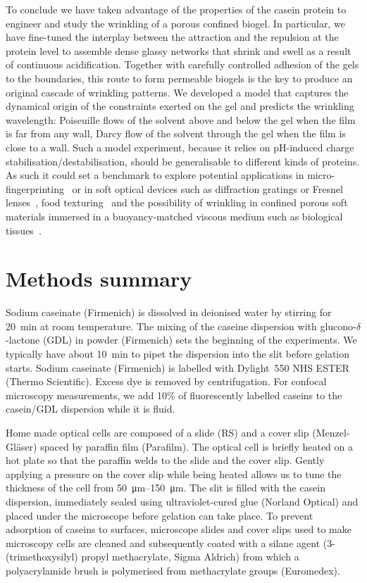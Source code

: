\documentclass[twocolumn,superscriptaddress,showpacs,preprintnumbers,
amsmath,amssymb,prl]{revtex4-1}
\begin{document}
To conclude we have taken advantage of the properties of the casein protein to engineer and study the wrinkling of a porous confined biogel. In particular, we have fine-tuned the interplay between the attraction and the repulsion at the protein level to assemble dense glassy networks that shrink and swell as a result of continuous acidification. Together with carefully controlled adhesion of the gels to the boundaries, this route to form permeable biogels is the key to produce an original cascade of wrinkling patterns. We developed a model that captures the dynamical origin of the constraints exerted on the gel and predicts the wrinkling wavelength: Poiseuille flows of the solvent above and below the gel when the film is far from any wall, Darcy flow of the solvent through the gel when the film is close to a wall. Such a model experiment, because it relies on pH-induced charge stabilisation/destabilisation, should be generalisable to different kinds of proteins. As such it could set a benchmark to explore potential applications in micro-fingerprinting~\cite{Bae2015} or in soft optical devices such as diffraction gratings or Fresnel lenses~\cite{Li2013}, food texturing~\cite{Mezzenga2005,Gibaud2012a} and the possibility of wrinkling in confined porous soft materials immersed in a buoyancy-matched viscous medium such as biological tissues~\cite{Ma2004,Longley2013,Fleury2015}.



\section*{Methods summary}

Sodium caseinate (Firmenich) is dissolved in deionised water by stirring for \SI{20}{\minute} at room temperature. The mixing of the caseine dispersion with glucono-$\delta$-lactone (GDL) in powder (Firmenich) sets the beginning of the experiments. We typically have about \SI{10}{\minute} to pipet the dispersion into the slit before gelation starts. Sodium caseinate (Firmenich) is labelled with Dylight~550 NHS ESTER (Thermo Scientific). Excess dye is removed by centrifugation. For confocal microscopy measurements, we add 10\% of fluorescently labelled caseins to the casein/GDL dispersion while it is fluid.

Home made optical cells are composed of a slide (RS) and a cover slip (Menzel-Gl\"aser) spaced by paraffin film (Parafilm). The optical cell is briefly heated on a hot plate so that the paraffin welds to the slide and the cover slip. Gently applying a pressure on the cover slip while being heated allows us to tune the thickness of the cell from \SIrange{50}{150}{\micro\metre}. The slit is filled with the casein dispersion, immediately sealed using ultraviolet-cured glue (Norland Optical) and placed under the microscope before gelation can take place. To prevent adsorption of caseins to surfaces, microscope slides and cover slips used to make microscopy cells are cleaned and subsequently coated with a silane agent (3-(trimethoxysilyl) propyl methacrylate, Sigma Aldrich) from which a polyacrylamide brush is polymerised from methacrylate groups (Euromedex).
\end{document}
